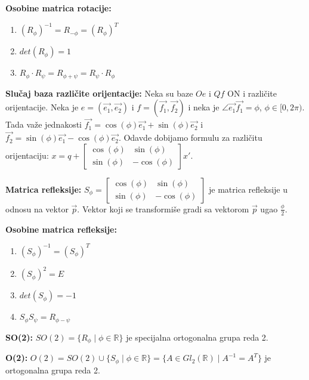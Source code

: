 \documentclass[12pt]{article}
\newcommand{\vek}[1]{\overrightarrow{#1}}
\begin{document}
\textbf{Osobine matrica rotacije:}
\begin{enumerate}[label=\textit{\arabic*)}]
    \item $(R_\phi)^{-1}=R_{-\phi}=(R_\phi)^T$
    \item $det(R_\phi)=1$
    \item $R_\phi\cdot R_\psi=R_{\phi+\psi}=R_\psi\cdot R_\phi$
\end{enumerate}
\par

\textbf{Slučaj baza različite orijentacije:} Neka su baze $Oe$ i $Qf$ ON i
različite orijentacije. Neka je $e=(\vek{e_1},\vek{e_2})$ i
$f=(\vek{f_1},\vek{f_2})$ i neka je $\angle{\vek{e_1}\vek{f_1}}=\phi$,
$\phi\in[0,2\pi)$. Tada važe jednakosti
$\vek{f_1}=\cos(\phi)\vek{e_1}+\sin(\phi)\vek{e_2}$ i
$\vek{f_2}=\sin(\phi)\vek{e_1}-\cos(\phi)\vek{e_2}$. Odavde dobijamo formulu za
različitu orijentaciju: $x=q+\begin{bmatrix}
        \cos(\phi) & \sin(\phi)  \\
        \sin(\phi) & -\cos(\phi)
    \end{bmatrix} x'$.
\par

\textbf{Matrica refleksije:} $S_\phi=\begin{bmatrix}
        \cos(\phi) & \sin(\phi)  \\
        \sin(\phi) & -\cos(\phi)
    \end{bmatrix}$ je matrica refleksije u odnosu na vektor $\vek{p}$.
Vektor koji se transformiše gradi sa vektorom $\vek{p}$ ugao $\frac{\phi}{2}$.
\par

\textbf{Osobine matrica refleksije:}
\begin{enumerate}[label=\textit{\arabic*)}]
    \item $(S_\phi)^{-1}=(S_\phi)^T$
    \item $(S_\phi)^{2}=E$
    \item $det(S_\phi)=-1$
    \item $S_\phi S_\psi=R_{\phi-\psi}$
\end{enumerate}
\par

\textbf{SO(2):} $SO(2)=\{R_\phi\mid\phi\in\mathbb{R}\}$ je specijalna
ortogonalna grupa reda 2.
\par

\textbf{O(2):} $O(2)=SO(2)\cup\{S_\phi\mid\phi\in\mathbb{R}\}=\{A\in Gl_2(\mathbb{R})\mid A^{-1}=A^T\}$
je ortogonalna grupa reda 2.
\end{document}
